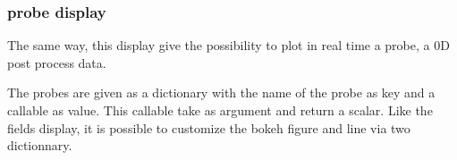 \documentclass[letterpaper,10pt,english]{sphinxmanual}
\begin{document}
\subsubsection{probe display}
\label{\detokenize{cookbook/displays:probe-display}}
The same way, this display give the possibility to plot in real time a
probe, a 0D post process data.

The probes are given as a dictionary with the name of the probe as key
and a callable as value. This callable take  as argument
and return a scalar. Like the fields display, it is possible to
customize the bokeh figure and line via two dictionnary.

\begin{sphinxVerbatim}[commandchars=\\\{\}]
     
   

   
  

     
    

   
     
                     

  
     


\end{sphinxVerbatim}
\end{document}

